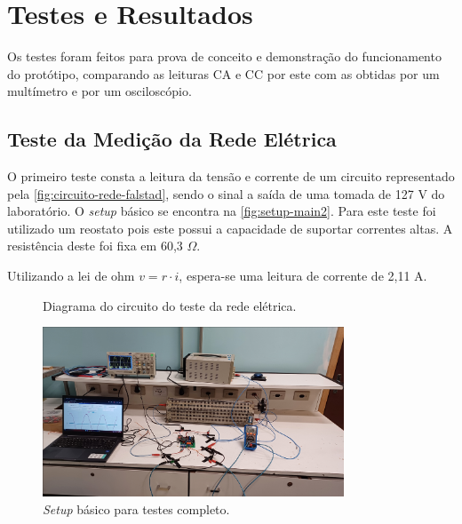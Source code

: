 
\chapter{Testes e Resultados}\label{cap:resultados}

Os testes foram feitos para prova de conceito e demonstração do funcionamento do protótipo, comparando as leituras \gls{CA} e \gls{CC} por este com as obtidas por um multímetro e por um osciloscópio.

\section{Teste da Medição da Rede Elétrica}\label{sec:l-rede}

O primeiro teste consta a leitura da tensão e corrente de um circuito representado pela \autoref{fig:circuito-rede-falstad}, sendo o sinal a saída de uma tomada de 127 V do laboratório. O \textit{setup} básico se encontra na \autoref{fig:setup-main2}. Para este teste foi utilizado um reostato pois este possui a capacidade de suportar correntes altas. A resistência deste foi fixa em 60,3 $\Omega$.

Utilizando a lei de ohm $v = r \cdot  i$, espera-se uma leitura de corrente de 2,11 A.

\begin{figure}[htb!]
    \caption{Diagrama do circuito do teste da rede elétrica.}
    \label{fig:circuito-rede-falstad}
    \fonte{}
\end{figure}

\begin{figure}[htb!]
    \caption{\textit{Setup} básico para testes completo.}
    \label{fig:setup-main2}
    \includegraphics[width=0.8\textwidth]{figuras/setup-basico-full.png}
    \fonte{}
\end{figure}

